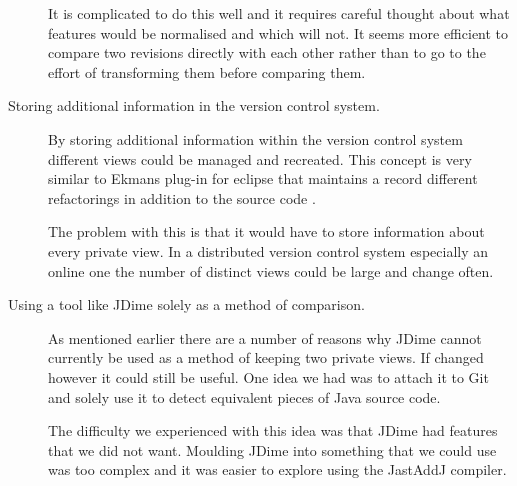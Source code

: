 \begin{description}
    It is complicated to do this well and it requires careful thought about what features would be normalised and which will not.
    It seems more efficient to compare two revisions directly with each other rather than to go to the effort of transforming them before comparing them. 
  \item [Storing additional information in the version control system.]
    By storing additional information within the version control system different views could be managed and recreated.
    This concept is very similar to Ekmans plug-in for eclipse that maintains a record different refactorings in addition to the source code \cite{Ekman2004}.

    The problem with this is that it would have to store information about every private view.  In a distributed version control system especially an online one the number of distinct views could be large and change often.   
  
  \item [Using a tool like JDime solely as a method of comparison.]
    As mentioned earlier there are a number of reasons why JDime cannot currently be used as a method of keeping two private views. If changed however it could still be useful.  One idea we had was to attach it to Git and solely use it to detect equivalent pieces of Java source code.

    The difficulty we experienced with this idea was that JDime had features that we did not want.  Moulding JDime into something that we could use was too complex and it was easier to explore using the JastAddJ compiler. 
\end{description}


